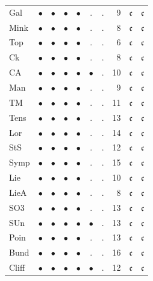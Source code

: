 {\begin{longtable}{l c c c c c c r c c}
\textsf{Gal} & $\bullet$ & $\bullet$ & $\bullet$ & $\bullet$ & . & . & 9 & $\mathfrak c$ & $\mathfrak c$ \\
\textsf{Mink} & $\bullet$ & $\bullet$ & $\bullet$ & $\bullet$ & . & . & 8 & $\mathfrak c$ & $\mathfrak c$ \\
\textsf{Top} & $\bullet$ & $\bullet$ & $\bullet$ & $\bullet$ & . & . & 6 & $\mathfrak c$ & $\mathfrak c$ \\
\textsf{Ck} & $\bullet$ & $\bullet$ & $\bullet$ & $\bullet$ & . & . & 8 & $\mathfrak c$ & $\mathfrak c$ \\
\textsf{CA} & $\bullet$ & $\bullet$ & $\bullet$ & $\bullet$ & $\bullet$ & . & 10 & $\mathfrak c$ & $\mathfrak c$ \\
\textsf{Man} & $\bullet$ & $\bullet$ & $\bullet$ & $\bullet$ & . & . & 9 & $\mathfrak c$ & $\mathfrak c$ \\
\textsf{TM} & $\bullet$ & $\bullet$ & $\bullet$ & $\bullet$ & . & . & 11 & $\mathfrak c$ & $\mathfrak c$ \\
\textsf{Tens} & $\bullet$ & $\bullet$ & $\bullet$ & $\bullet$ & . & . & 13 & $\mathfrak c$ & $\mathfrak c$ \\
\textsf{Lor} & $\bullet$ & $\bullet$ & $\bullet$ & $\bullet$ & . & . & 14 & $\mathfrak c$ & $\mathfrak c$ \\
\textsf{StS} & $\bullet$ & $\bullet$ & $\bullet$ & $\bullet$ & . & . & 12 & $\mathfrak c$ & $\mathfrak c$ \\
\textsf{Symp} & $\bullet$ & $\bullet$ & $\bullet$ & $\bullet$ & . & . & 15 & $\mathfrak c$ & $\mathfrak c$ \\
\textsf{Lie} & $\bullet$ & $\bullet$ & $\bullet$ & $\bullet$ & . & . & 10 & $\mathfrak c$ & $\mathfrak c$ \\
\textsf{LieA} & $\bullet$ & $\bullet$ & $\bullet$ & $\bullet$ & . & . & 8 & $\mathfrak c$ & $\mathfrak c$ \\
\textsf{SO3} & $\bullet$ & $\bullet$ & $\bullet$ & $\bullet$ & . & . & 13 & $\mathfrak c$ & $\mathfrak c$ \\
\textsf{SUn} & $\bullet$ & $\bullet$ & $\bullet$ & $\bullet$ & $\bullet$ & . & 13 & $\mathfrak c$ & $\mathfrak c$ \\
\textsf{Poin} & $\bullet$ & $\bullet$ & $\bullet$ & $\bullet$ & . & . & 13 & $\mathfrak c$ & $\mathfrak c$ \\
\textsf{Bund} & $\bullet$ & $\bullet$ & $\bullet$ & $\bullet$ & . & . & 16 & $\mathfrak c$ & $\mathfrak c$ \\
\textsf{Cliff} & $\bullet$ & $\bullet$ & $\bullet$ & $\bullet$ & $\bullet$ & . & 12 & $\mathfrak c$ & $\mathfrak c$ \\

\end{longtable}}
